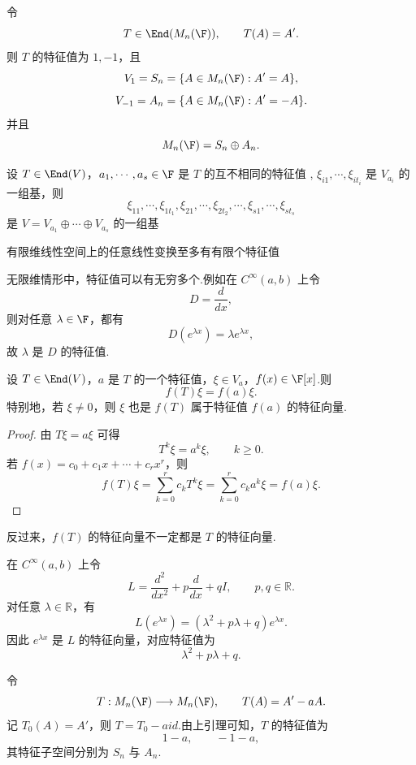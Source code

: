 \begin{example}
	令
	\[
	T\in\End(M_n(\F)),
	\qquad T(A)=A'.
	\]
	则 $T$ 的特征值为 $1,-1$，且
	\[
	V_1=S_n=\{A\in M_n(\F):A'=A\},
	\]
	\[
	V_{-1}=A_n=\{A\in M_n(\F):A'=-A\}.
	\]
	并且
	\[
	M_n(\F)=S_n\oplus A_n.
	\]
\end{example}
\begin{corollary}
	设 $T\in\End(V)$，$a_1,\cdots,a_s\in\F$ 是 $T$ 的互不相同的特征值
	, $\xi_{i1},\cdots,\xi_{it_i}$ 是 $V_{a_i}$ 的一组基，则
	\[
	\xi_{11},\cdots,\xi_{1t_1},\xi_{21},\cdots,\xi_{2t_2},\cdots,
	\xi_{s1},\cdots,\xi_{st_s}
	\]
	是 $V=V_{a_1}\oplus\cdots\oplus V_{a_s}$ 的一组基
\end{corollary}
\begin{corollary}
	有限维线性空间上的任意线性变换至多有有限个特征值
\end{corollary}
无限维情形中，特征值可以有无穷多个.例如在 $C^\infty(a,b)$ 上令
\[
D=\frac{d}{dx},
\]
则对任意 $\lambda\in\F$，都有
\[
D(e^{\lambda x})=\lambda e^{\lambda x},
\]
故 $\lambda$ 是 $D$ 的特征值.

\begin{lemma}
	设 $T\in\End(V)$，$a$ 是 $T$ 的一个特征值，$\xi\in V_a$，$f(x)\in\F[x]$.则
	\[
	f(T)\xi=f(a)\xi.
	\]
	特别地，若 $\xi\neq0$，则 $\xi$ 也是 $f(T)$ 属于特征值 $f(a)$ 的特征向量.
\end{lemma}

\begin{proof}
	由 $T\xi=a\xi$ 可得
	\[
	T^k\xi=a^k\xi,
	\qquad k\geq0.
	\]
	若 $f(x)=c_0+c_1x+\cdots+c_rx^r$，则
	\[
	f(T)\xi=\sum_{k=0}^r c_kT^k\xi
	=\sum_{k=0}^r c_ka^k\xi=f(a)\xi.
	\]
\end{proof}

反过来，$f(T)$ 的特征向量不一定都是 $T$ 的特征向量.

\begin{example}
	在 $C^\infty(a,b)$ 上令
	\[
	L=\frac{d^2}{dx^2}+p\frac{d}{dx}+qI,
	\qquad p,q\in\mathbb{R}.
	\]
	对任意 $\lambda\in\mathbb{R}$，有
	\[
	L(e^{\lambda x})=(\lambda^2+p\lambda+q)e^{\lambda x}.
	\]
	因此 $e^{\lambda x}$ 是 $L$ 的特征向量，对应特征值为
	\[
	\lambda^2+p\lambda+q.
	\]
\end{example}

\begin{example}
	令
	\[
	T:M_n(\F)\longrightarrow M_n(\F),
	\qquad T(A)=A'-aA.
	\]
	记 $T_0(A)=A'$，则 $T=T_0-aid
	$.由上引理可知，$T$ 的特征值为
	\[
	1-a,
	\qquad -1-a,
	\]
	其特征子空间分别为 $S_n$ 与 $A_n$.
\end{example}

